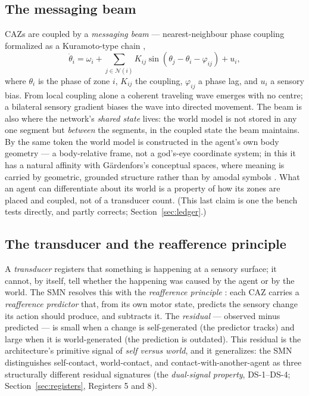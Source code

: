 \documentclass[utf8]{FrontiersinHarvard} %
\begin{document}
\subsection{The messaging beam}
CAZs are coupled by a \emph{messaging beam} --- nearest-neighbour phase coupling formalized as a Kuramoto-type chain \citep{Kuramoto1984Oscillations},
\begin{equation}
\dot\theta_i = \omega_i + \sum_{j\in\mathcal N(i)} K_{ij}\sin(\theta_j - \theta_i - \varphi_{ij}) + u_i,
\label{eq:kuramoto}
\end{equation}
where $\theta_i$ is the phase of zone $i$, $K_{ij}$ the coupling, $\varphi_{ij}$ a phase lag, and $u_i$ a sensory bias. From local coupling alone a coherent traveling wave emerges with no centre; a bilateral sensory gradient biases the wave into directed movement. The beam is also where the network's \emph{shared state} lives: the world model is not stored in any one segment but \emph{between} the segments, in the coupled state the beam maintains. By the same token the world model is constructed in the agent's own body geometry --- a body-relative frame, not a god's-eye coordinate system; in this it has a natural affinity with G\"ardenfors's conceptual spaces, where meaning is carried by geometric, grounded structure rather than by amodal symbols \citep{Gardenfors2004ConceptualSpaces,Gardenfors2014Geometry}. What an agent can differentiate about its world is a property of how its zones are placed and coupled, not of a transducer count. (This last claim is one the bench tests directly, and partly corrects; Section~\ref{sec:ledger}.)

\subsection{The transducer and the reafference principle}
A \emph{transducer} registers that something is happening at a sensory surface; it cannot, by itself, tell whether the happening was caused by the agent or by the world. The SMN resolves this with the \emph{reafference principle} \citep{vonHolstMittelstaedt1950,CrapseSommer2008}: each CAZ carries a \emph{reafference predictor} that, from its own motor state, predicts the sensory change its action should produce, and subtracts it. The \emph{residual} --- observed minus predicted --- is small when a change is self-generated (the predictor tracks) and large when it is world-generated (the prediction is outdated). This residual is the architecture's primitive signal of \emph{self versus world}, and it generalizes: the SMN distinguishes self-contact, world-contact, and contact-with-another-agent as three structurally different residual signatures (the \emph{dual-signal property}, DS-1--DS-4; Section~\ref{sec:registers}, Registers 5 and 8).
\end{document}
